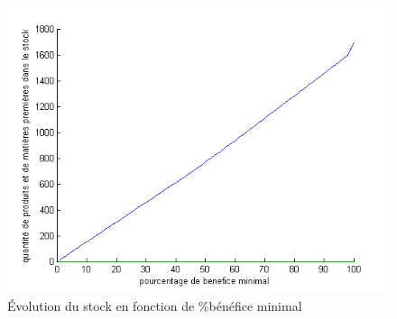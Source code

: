 \documentclass[12pt]{article}
\begin{document}
\begin{figure}[H]
    \begin{center}
        \includegraphics[scale=0.8]{plots_partie1/plot_stock.png}
        \caption{
            \label{fig} Évolution du stock en fonction de \%bénéfice minimal
        }
    \end{center}
\end{figure} 
\end{document}
